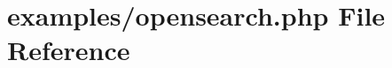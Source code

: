 \hypertarget{opensearch_8php}{
\section{examples/opensearch.php File Reference}
\label{opensearch_8php}
}
